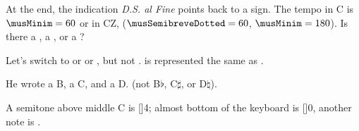 \documentclass[12pt]{article}
\renewcommand{\fl}{\musFlat}
\renewcommand{\sh}{\musSharp}
\renewcommand{\na}{\musNatural}
\begin{document}
At the end, the indication \emph{D.S. al Fine} points back to a \musSegno{} sign.
The tempo in C is $\musMinim = 60$ or in CZ, ($\musSemibreveDotted = 60$,
$\musMinim = 180$).
Is there a \musSemiminim, a \musEighth, or a \musSixteenth?

Let's switch to \meterC{} or \meterCThree{} or \meterCThreeTwo, but not
\meterCutC. \meterCZ{} is represented the same as .

He wrote a B\fl, a C\sh, and a D\na. (not B$\flat$, C$\sharp$, or D$\natural$).

A semitone above middle C is [\sh]{4}; almost bottom of the
keyboard is [\fl]{0}, another note is .
\end{document}
